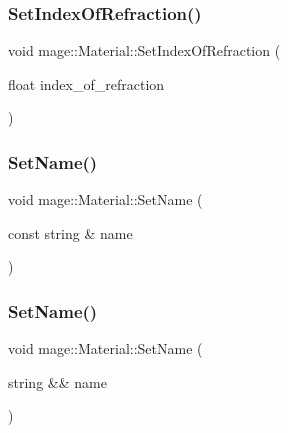 \hypertarget{structmage_1_1_material_ae0f95f54af97ecff043ec7728260ae2b}{}\label{structmage_1_1_material_ae0f95f54af97ecff043ec7728260ae2b} 
\subsubsection{\texorpdfstring{Set\+Index\+Of\+Refraction()}{SetIndexOfRefraction()}}
{\footnotesize\ttfamily void mage\+::\+Material\+::\+Set\+Index\+Of\+Refraction (\begin{DoxyParamCaption}\item[{float}]{index\+\_\+of\+\_\+refraction }\end{DoxyParamCaption})\hspace{0.3cm}{\ttfamily [noexcept]}}

\hypertarget{structmage_1_1_material_a4795f7aa36a445c09af6268a4af8cb61}{}\label{structmage_1_1_material_a4795f7aa36a445c09af6268a4af8cb61} 
\subsubsection{\texorpdfstring{Set\+Name()}{SetName()}\hspace{0.1cm}{\footnotesize\ttfamily [1/2]}}
{\footnotesize\ttfamily void mage\+::\+Material\+::\+Set\+Name (\begin{DoxyParamCaption}\item[{const string \&}]{name }\end{DoxyParamCaption})}

\hypertarget{structmage_1_1_material_ad612e4174b030bb002cedaf054e18f82}{}\label{structmage_1_1_material_ad612e4174b030bb002cedaf054e18f82} 
\subsubsection{\texorpdfstring{Set\+Name()}{SetName()}\hspace{0.1cm}{\footnotesize\ttfamily [2/2]}}
{\footnotesize\ttfamily void mage\+::\+Material\+::\+Set\+Name (\begin{DoxyParamCaption}\item[{string \&\&}]{name }\end{DoxyParamCaption})}

